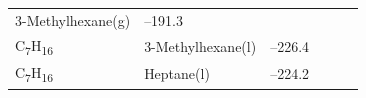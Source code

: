 \documentclass[
  9pt,
]{extbook}
\theoremstyle{definition}
\theoremstyle{definition}
\theoremstyle{definition}
\theoremstyle{remark}
\begin{document}
\begin{longtable}[]{@{}llllll@{}}
\begin{minipage}[t]{0.17\columnwidth}
3-Methylhexane(g)\strut
\end{minipage} & \begin{minipage}[t]{0.15\columnwidth}\raggedright
--191.3\strut
\end{minipage} & \begin{minipage}[t]{0.15\columnwidth}\raggedright
\strut
\end{minipage} & \begin{minipage}[t]{0.14\columnwidth}\raggedright
\strut
\end{minipage} & \begin{minipage}[t]{0.14\columnwidth}\raggedright
\strut
\end{minipage}\tabularnewline
\begin{minipage}[t]{0.07\columnwidth}\raggedright
C\textsubscript{7}H\textsubscript{16}\strut
\end{minipage} & \begin{minipage}[t]{0.17\columnwidth}\raggedright
3-Methylhexane(l)\strut
\end{minipage} & \begin{minipage}[t]{0.15\columnwidth}\raggedright
--226.4\strut
\end{minipage} & \begin{minipage}[t]{0.15\columnwidth}\raggedright
\strut
\end{minipage} & \begin{minipage}[t]{0.14\columnwidth}\raggedright
\strut
\end{minipage} & \begin{minipage}[t]{0.14\columnwidth}\raggedright
\strut
\end{minipage}\tabularnewline
\begin{minipage}[t]{0.07\columnwidth}\raggedright
C\textsubscript{7}H\textsubscript{16}\strut
\end{minipage} & \begin{minipage}[t]{0.17\columnwidth}\raggedright
Heptane(l)\strut
\end{minipage} & \begin{minipage}[t]{0.15\columnwidth}\raggedright
--224.2\strut
\end{minipage} & \begin{minipage}[t]{0.15\columnwidth}\raggedright
\strut
\end{minipage} & \begin{minipage}[t]{0.14\columnwidth}\raggedright
\strut
\end{minipage} & \begin{minipage}[t]{0.14\columnwidth}\raggedright

\end{minipage}
\end{longtable}
\end{document}
